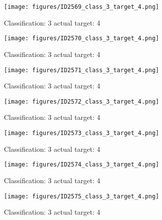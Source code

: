 \begin{figure}[h!]
\begin{center}
\texttt{[image: figures/ID2569\_class\_3\_target\_4.png]}
\end{center}
\caption{ Classification: 3 actual target: 4}
\label{fig:ID2569_class_3_target_4}
\end{figure}
\begin{figure}[h!]
\begin{center}
\texttt{[image: figures/ID2570\_class\_3\_target\_4.png]}
\end{center}
\caption{ Classification: 3 actual target: 4}
\label{fig:ID2570_class_3_target_4}
\end{figure}
\begin{figure}[h!]
\begin{center}
\texttt{[image: figures/ID2571\_class\_3\_target\_4.png]}
\end{center}
\caption{ Classification: 3 actual target: 4}
\label{fig:ID2571_class_3_target_4}
\end{figure}
\begin{figure}[h!]
\begin{center}
\texttt{[image: figures/ID2572\_class\_3\_target\_4.png]}
\end{center}
\caption{ Classification: 3 actual target: 4}
\label{fig:ID2572_class_3_target_4}
\end{figure}
\begin{figure}[h!]
\begin{center}
\texttt{[image: figures/ID2573\_class\_3\_target\_4.png]}
\end{center}
\caption{ Classification: 3 actual target: 4}
\label{fig:ID2573_class_3_target_4}
\end{figure}
\begin{figure}[h!]
\begin{center}
\texttt{[image: figures/ID2574\_class\_3\_target\_4.png]}
\end{center}
\caption{ Classification: 3 actual target: 4}
\label{fig:ID2574_class_3_target_4}
\end{figure}
\begin{figure}[h!]
\begin{center}
\texttt{[image: figures/ID2575\_class\_3\_target\_4.png]}
\end{center}
\caption{ Classification: 3 actual target: 4}
\label{fig:ID2575_class_3_target_4}
\end{figure}

